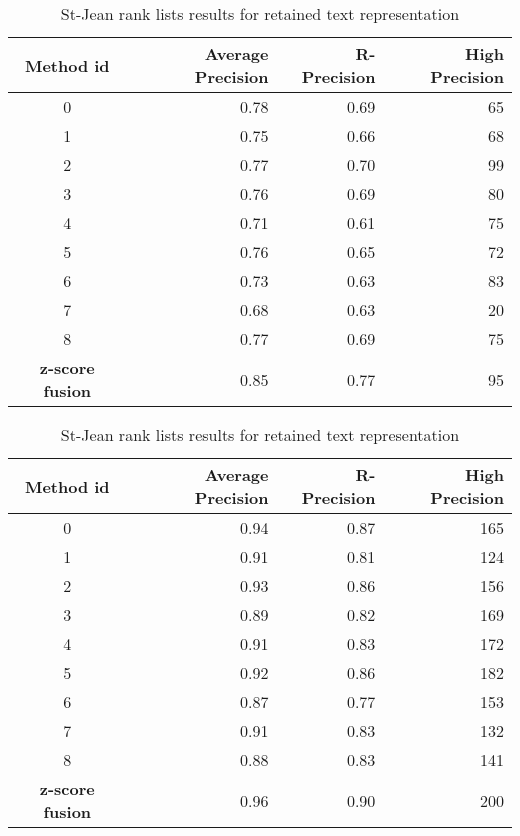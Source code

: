\begin{table}[H]
  \centering
  \caption{St-Jean rank lists results for retained text representation}
  \label{tab:9rl_results_st_jean}

  \begin{tabular}{c r r r}
    \toprule
    Method id &
    Average Precision &
    R-Precision &
    High Precision \\
    \midrule
    0 & 0.78 & 0.69 & 65 \\
    1 & 0.75 & 0.66 & 68 \\
    2 & 0.77 & 0.70 & 99 \\
    3 & 0.76 & 0.69 & 80 \\
    4 & 0.71 & 0.61 & 75 \\
    5 & 0.76 & 0.65 & 72 \\
    6 & 0.73 & 0.63 & 83 \\
    7 & 0.68 & 0.63 & 20 \\
    8 & 0.77 & 0.69 & 75 \\
    \textbf{z-score fusion} & 0.85 & 0.77 & 95 \\
    \bottomrule
  \end{tabular}

  \vspace{0.5cm}

  \label{tab:9rl_results_st_jean_B}
  \begin{tabular}{c r r r}
    \toprule
    Method id &
    Average Precision &
    R-Precision &
    High Precision \\
    \midrule
    0 & 0.94 & 0.87 & 165 \\
    1 & 0.91 & 0.81 & 124 \\
    2 & 0.93 & 0.86 & 156 \\
    3 & 0.89 & 0.82 & 169 \\
    4 & 0.91 & 0.83 & 172 \\
    5 & 0.92 & 0.86 & 182 \\
    6 & 0.87 & 0.77 & 153 \\
    7 & 0.91 & 0.83 & 132 \\
    8 & 0.88 & 0.83 & 141 \\
    \textbf{z-score fusion} & 0.96 & 0.90 & 200 \\
    \bottomrule
  \end{tabular}

  \vspace{0.5cm}


\end{table}
